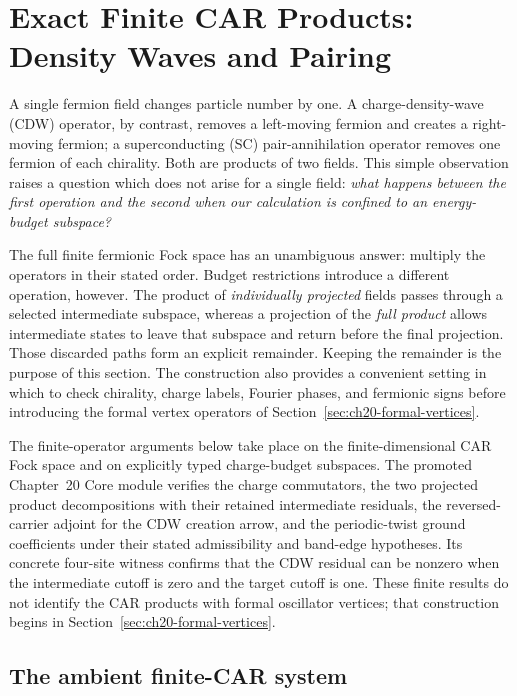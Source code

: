 \section{Exact Finite CAR Products: Density Waves and Pairing}
\label{sec:ch20-projected-products}

A single fermion field changes particle number by one.  A charge-density-wave
(CDW) operator, by contrast, removes a left-moving fermion and creates a
right-moving fermion; a superconducting (SC) pair-annihilation operator removes
one fermion of each chirality.  Both are products of two fields.  This simple
observation raises a question which does not arise for a single field:
\emph{what happens between the first operation and the second when our
calculation is confined to an energy-budget subspace?}

The full finite fermionic Fock space has an unambiguous answer: multiply the
operators in their stated order.  Budget restrictions introduce a different
operation, however.  The product of \emph{individually projected} fields
passes through a selected intermediate subspace, whereas a projection of the
\emph{full product} allows intermediate states to leave that subspace and
return before the final projection.  Those discarded paths form an explicit
remainder.  Keeping the remainder is the purpose of this section.  The
construction also provides a convenient setting in which to check chirality,
charge labels, Fourier phases, and fermionic signs before introducing the
formal vertex operators of Section~\ref{sec:ch20-formal-vertices}.

The finite-operator arguments below take place on the finite-dimensional
CAR Fock space and on explicitly typed charge-budget subspaces.  The promoted
Chapter~20 Core module verifies the charge commutators, the two projected
product decompositions with their retained intermediate residuals, the
reversed-carrier adjoint for the CDW creation arrow, and the periodic-twist
ground coefficients under their stated admissibility and band-edge hypotheses.
Its concrete four-site witness confirms that the CDW residual can be nonzero
when the intermediate cutoff is zero and the target cutoff is one.  These
finite results do not identify the CAR products with formal oscillator
vertices; that construction begins in Section~\ref{sec:ch20-formal-vertices}.

\subsection{The ambient finite-CAR system}
\label{subsec:ch20-ambient}


